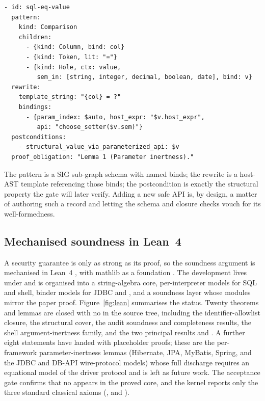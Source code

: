 \begin{verbatim}
- id: sql-eq-value
  pattern:
    kind: Comparison
    children:
      - {kind: Column, bind: col}
      - {kind: Token, lit: "="}
      - {kind: Hole, ctx: value,
         sem_in: [string, integer, decimal, boolean, date], bind: v}
  rewrite:
    template_string: "{col} = ?"
    bindings:
      - {param_index: $auto, host_expr: "$v.host_expr",
         api: "choose_setter($v.sem)"}
  postconditions:
    - structural_value_via_parameterized_api: $v
  proof_obligation: "Lemma 1 (Parameter inertness)."
\end{verbatim}

The pattern is a SIG sub-graph schema with named binds; the rewrite is a
host-AST template referencing those binds; the postcondition is exactly the
structural property the gate will later verify. Adding a new safe API is, by
design, a matter of authoring such a record and letting the schema and
closure checks vouch for its well-formedness.

\subsection{Mechanised soundness in Lean~4}
\label{sec:lean}

A security guarantee is only as strong as its proof, so the soundness
argument is mechanised in Lean~4 \citep{demoura2021lean4}, with mathlib as a
foundation \citep{mathlib2020}. The development lives under 
and is organised into a string-algebra core, per-interpreter models for SQL
and shell, binder models for JDBC and , and a soundness
layer whose modules mirror the paper proof. Figure~\ref{fig:lean} summarises
the status. Twenty theorems and lemmas are closed with no  in
the source tree, including the identifier-allowlist closure, the
structural cover, the audit soundness and completeness results, the shell
argument-inertness family, and the two principal results
 and . A further eight
statements have landed with placeholder  proofs; these are the
per-framework parameter-inertness lemmas (Hibernate, JPA, MyBatis, Spring,
and the JDBC and DB-API wire-protocol models) whose full discharge requires
an equational model of the driver protocol and is left as future work. The
acceptance gate  confirms that no
 appears in the proved core, and the kernel reports only the
three standard classical axioms (,  and
).


